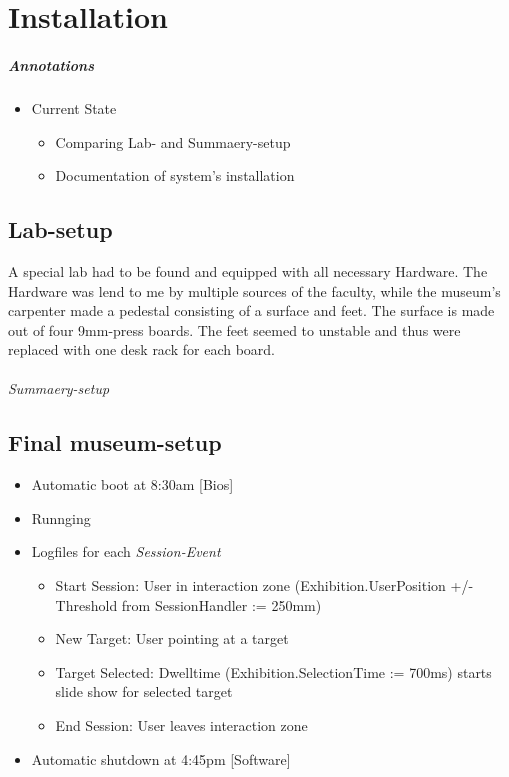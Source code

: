 \chapter{Installation}
\label{installation}

\paragraph{Annotations}

\begin{itemize}
	\item Current State
	\begin{itemize}
		\item Comparing Lab- and Summaery-setup
		\item Documentation of system's installation
	\end{itemize}
\end{itemize}



\section{Lab-setup}
\label{installation_lab}

A special lab had to be found and equipped with all necessary Hardware. The Hardware was lend to me by multiple sources of the faculty, while the museum's carpenter made a pedestal consisting of a surface and feet. The surface is made out of four 9mm-press boards. The feet seemed to unstable and thus were replaced with one desk rack for each board.
\\
\\
\textit{Summaery-setup}


\section{Final museum-setup}

\begin{itemize}
	\item Automatic boot at 8:30am [Bios]
	\item Runnging
	\item Logfiles for each \textit{Session-Event}
	\begin{itemize}
		\item Start Session: User in interaction zone (Exhibition.UserPosition +/- Threshold from SessionHandler := 250mm)
		\item New Target: User pointing at a target
		\item Target Selected: Dwelltime (Exhibition.SelectionTime := 700ms) starts slide show for selected target
		\item End Session: User leaves interaction zone
	\end{itemize}
	\item Automatic shutdown at 4:45pm [Software]
\end{itemize}